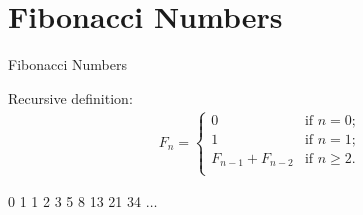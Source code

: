 \documentclass{beamer}
\begin{document}
\section{Fibonacci Numbers}

\begin{frame}{Fibonacci Numbers}
    \begin{alertblock}{Recursive definition:}
        \begin{align*}
            F_n =
                \begin{cases}
                    0 & \text{if $n = 0$;} \\
                    1 & \text{if $n = 1$;} \\
                    F_{n - 1} + F_{n - 2} & \text{if $n \geq 2$.}\\
                \end{cases}
        \end{align*}
    \end{alertblock}
    \centering
    \LARGE
    0 \hspace{2mm} 1 \hspace{2mm} 1 \hspace{2mm} 2 \hspace{2mm} 3 \hspace{2mm} 5 \hspace{2mm} 8 \hspace{2mm} 13 \hspace{2mm} 21 \hspace{2mm} 34 \hspace{2mm} $\ldots$
\end{frame}
\end{document}
